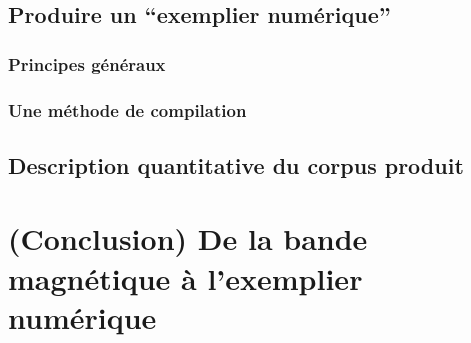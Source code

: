 

\subsection{Produire un \enquote{exemplier numérique}}

\subsubsection{Principes généraux}




\subsubsection{Une méthode de compilation}


\subsection{Description quantitative du corpus produit}


\section*{(Conclusion) De la bande magnétique à l'exemplier numérique}

